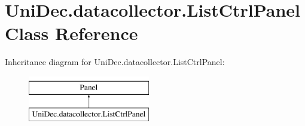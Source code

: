 \hypertarget{class_uni_dec_1_1datacollector_1_1_list_ctrl_panel}{}\section{Uni\+Dec.\+datacollector.\+List\+Ctrl\+Panel Class Reference}
\label{class_uni_dec_1_1datacollector_1_1_list_ctrl_panel}
Inheritance diagram for Uni\+Dec.\+datacollector.\+List\+Ctrl\+Panel\+:\begin{figure}[H]
\begin{center}
\leavevmode
\includegraphics[height=2.000000cm]{class_uni_dec_1_1datacollector_1_1_list_ctrl_panel}
\end{center}
\end{figure}
